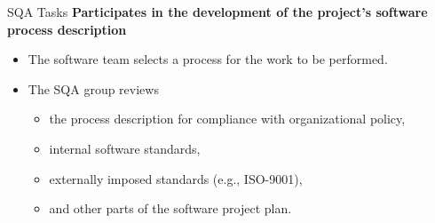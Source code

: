 \documentclass{beamer}
\begin{document}
\begin{frame}{SQA Tasks}
	\textbf{Participates in the development of the project’s software process description}
	\begin{itemize}
		\item The software team selects a process for the work to be performed.
	
			\item The SQA group reviews
				\begin{itemize}
			\item the process description for compliance with organizational policy, 
			\item internal software standards,
			\item externally imposed standards (e.g., ISO-9001),
			\item and other parts of the software project plan.
		\end{itemize}
	\end{itemize}
\end{frame}
\end{document}
